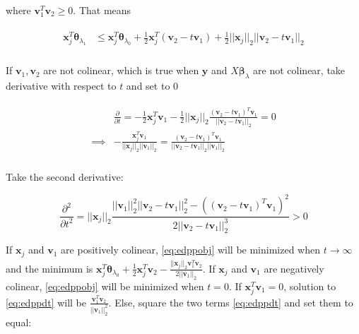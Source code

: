 where $\boldsymbol v_1^T\boldsymbol v_2\geq0$. That means

\begin{gather}
    \label{eq:edppobj}
    \begin{aligned}
        \boldsymbol x_j^T\boldsymbol\theta_{\lambda_1}&\leq \boldsymbol x_j^T\boldsymbol\theta_{\lambda_0}+\frac{1}{2}\boldsymbol x_j^T(\boldsymbol v_2-t\boldsymbol v_1)+\frac{1}{2}||\boldsymbol x_j||_2||\boldsymbol v_2-t\boldsymbol v_1||_2\\
    \end{aligned}
\end{gather}

If $\boldsymbol v_1,\boldsymbol v_2$ are not colinear, which is true when $\boldsymbol y$ and $X\boldsymbol\beta_\lambda$ are not colinear, take derivative with respect to $t$ and set to 0

\begin{gather}
    \label{eq:edppdt}
    \begin{aligned}
        &\frac{\partial}{\partial t}=-\frac{1}{2}\boldsymbol x_j^T\boldsymbol v_1-\frac{1}{2}||\boldsymbol x_j||_2\frac{(\boldsymbol v_2-t\boldsymbol v_1)^T\boldsymbol v_1}{||\boldsymbol v_2-t\boldsymbol v_1||_2}=0\\
        \implies & -\frac{\boldsymbol x_j^T\boldsymbol v_1}{||\boldsymbol x_j||_2||\boldsymbol v_1||_2}=\frac{(\boldsymbol v_2-t\boldsymbol v_1)^T\boldsymbol v_1}{||\boldsymbol v_2-t\boldsymbol v_1||_2||\boldsymbol v_1||_2}\\
    \end{aligned}
\end{gather}

Take the second derivative:

\begin{equation}
    \frac{\partial^2}{\partial t^2}=||\boldsymbol x_j||_2\frac{||\boldsymbol v_1||^2_2||\boldsymbol v_2-t\boldsymbol v_1||^2_2-\left((\boldsymbol v_2-t\boldsymbol v_1)^T\boldsymbol v_1\right)^2}{2||\boldsymbol v_2-t\boldsymbol v_1||^3_2}>0
\end{equation}

If $\boldsymbol x_j$ and $\boldsymbol v_1$ are positively colinear, \eqref{eq:edppobj} will be minimized when $t\xrightarrow[]{}\infty$ and the minimum is $\boldsymbol x_j^T\boldsymbol\theta_{\lambda_0}+\frac{1}{2}\boldsymbol x_j^T \boldsymbol v_2-\frac{||\boldsymbol x_j||_2 \boldsymbol v_1^T \boldsymbol v_2}{2||\boldsymbol v_1||_2 }$. If $\boldsymbol x_j$ and $\boldsymbol v_1$ are negatively colinear, \eqref{eq:edppobj} will be minimized when $t=0$. If $\boldsymbol x_j^T \boldsymbol v_1=0$, solution to \eqref{eq:edppdt} will be $\frac{\boldsymbol v_1^T \boldsymbol v_2}{||\boldsymbol v_1||_2^2}$. Else, square the two terms \eqref{eq:edppdt} and set them to equal:

